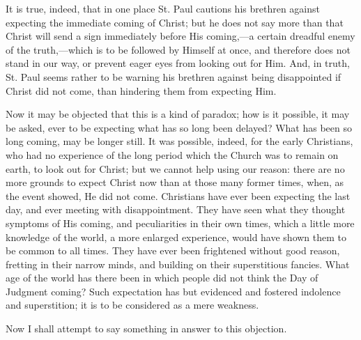 It is true, indeed, that in one place St. Paul cautions his
brethren against expecting the immediate coming of Christ; but he does
not say more than that Christ will send a sign immediately before His
coming,—a certain dreadful enemy of the truth,—which is to be
followed by Himself at once, and therefore does not stand in our way,
or prevent eager eyes from looking out for Him. And, in truth, St.
Paul seems rather to be warning his brethren against being
disappointed if Christ did not come, than hindering them from
expecting Him.

Now it may be objected that this is a kind of paradox; how is it
possible, it may be asked, ever to be expecting what has so long been
delayed? What has been so long coming, may be longer still. It was
possible, indeed, for the early Christians, who had no experience of
the long period which the Church was to remain on earth, to look out
for Christ; but we cannot help using our reason: there are no more
grounds to expect Christ now than at those many former times, when, as
the event showed, He did not come. Christians have ever been expecting
the last day, and ever meeting with disappointment. They have seen
what they thought symptoms of His coming, and peculiarities in their
own times, which a little more knowledge of the world, a more enlarged
experience, would have shown them to be common to all times. They have
ever been frightened without good reason, fretting in their narrow
minds, and building on their superstitious fancies. What age of the
world has there been in which people did not think the Day of Judgment
coming? Such expectation has but evidenced and fostered indolence and
superstition; it is to be considered as a mere weakness.

Now I shall attempt to say something in answer to this objection.

